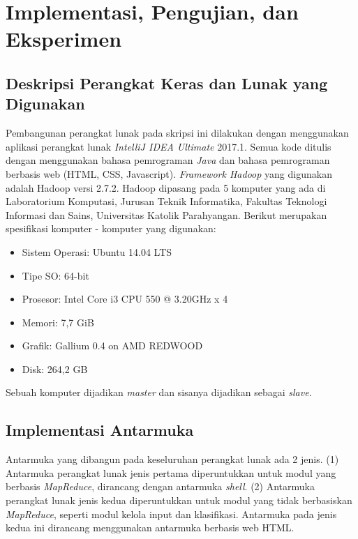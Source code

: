 \chapter{Implementasi, Pengujian, dan Eksperimen}
\label{chap:Implementasi, Pengujian, dan Eksperimen}

\section{Deskripsi Perangkat Keras dan Lunak yang Digunakan}
\label{sec:desc_perangkat}
Pembangunan perangkat lunak pada skripsi ini dilakukan dengan menggunakan aplikasi perangkat lunak \textit{IntelliJ IDEA Ultimate} 2017.1. Semua kode ditulis dengan menggunakan bahasa pemrograman \textit{Java} dan bahasa pemrograman berbasis web (HTML, CSS, Javascript). \textit{Framework Hadoop} yang digunakan adalah Hadoop versi 2.7.2. Hadoop dipasang pada 5 komputer yang ada di Laboratorium Komputasi, Jurusan Teknik Informatika, Fakultas Teknologi Informasi dan Sains, Universitas Katolik Parahyangan. Berikut merupakan spesifikasi komputer - komputer yang digunakan:
\begin{itemize}
	\item Sistem Operasi: Ubuntu 14.04 LTS
	\item Tipe SO: 64-bit
	\item Prosesor: Intel Core i3 CPU 550 @ 3.20GHz x 4 
	\item Memori: 7,7 GiB
	\item Grafik: Gallium 0.4 on AMD REDWOOD
	\item Disk: 264,2 GB
\end{itemize}
Sebuah komputer dijadikan \textit{master} dan sisanya dijadikan sebagai \textit{slave}.

\section{Implementasi Antarmuka}
\label{sec:impl_antarmuka}

Antarmuka yang dibangun pada keseluruhan perangkat lunak ada 2 jenis. (1) Antarmuka perangkat lunak jenis pertama diperuntukkan untuk modul yang berbasis \textit{MapReduce}, dirancang dengan antarmuka \textit{shell}. (2) Antarmuka perangkat lunak jenis kedua diperuntukkan untuk modul yang tidak berbasiskan \textit{MapReduce}, seperti modul kelola input dan klasifikasi. Antarmuka pada jenis kedua ini dirancang menggunakan antarmuka berbasis web HTML.

